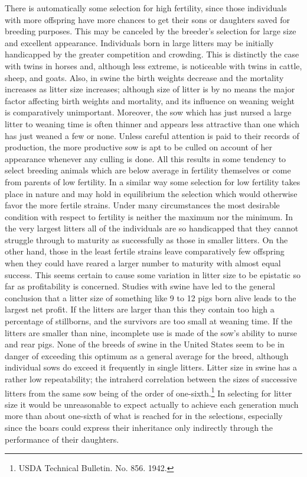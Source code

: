 There is automatically some selection for high fertility, since those
individuals with more offspring have more chances to get their sons or
daughters saved for breeding purposes. This may be canceled by the
breeder's selection for large size and excellent appearance. Individuals
born in large litters may be initially handicapped by the greater competition
and crowding. This is distinctly the case with twins in horses
and, although less extreme, is noticeable with twins in cattle, sheep, and
goats. Also, in swine the birth weights decrease and the mortality
increases as litter size increases; although size of litter is by no means the
major factor affecting birth weights and mortality, and its influence on
weaning weight is comparatively unimportant. Moreover, the sow
which has just nursed a large litter to weaning time is often thinner and
appears less attractive than one which has just weaned a few or none.
Unless careful attention is paid to their records of production, the more
productive sow is apt to be culled on account of her appearance whenever
any culling is done. All this results in some tendency to select
breeding animals which are below average in fertility themselves or
come from parents of low fertility. In a similar way some selection for
low fertility takes place in nature and may hold in equilibrium the
selection which would otherwise favor the more fertile strains. Under
many circumstances the most desirable condition with respect to fertility
is neither the maximum nor the minimum. In the very largest litters
all of the individuals are so handicapped that they cannot struggle
through to maturity as successfully as those in smaller litters. On the
other hand, those in the least fertile strains leave comparatively few
offspring when they could have reared a larger number to maturity with
almost equal success. This seems certain to cause some variation in litter
size to be epistatic so far as profitability is concerned. Studies with
swine have led to the general conclusion that a litter size of something
like 9 to 12 pigs born alive leads to the largest net profit. If the litters
are larger than this they contain too high a percentage of stillborns, and
the survivors are too small at weaning time. If the litters are smaller
than nine, incomplete use is made of the sow's ability to nurse and rear
pigs. None of the breeds of swine in the United States seem to be in danger
of exceeding this optimum as a general average for the breed, although
individual sows do exceed it frequently in single litters. Litter
size in swine has a rather low repeatability; the intraherd correlation
between the sizes of successive litters from the same sow being of the
order of one-sixth.\footnote{USDA Technical Bulletin. No. 856. 1942.} In
selecting for litter size it would be unreasonable to expect actually to
achieve each generation much more than about one-sixth of what is reached
for in the selections, especially since the boars could express their
inheritance only indirectly through the performance of their daughters.

